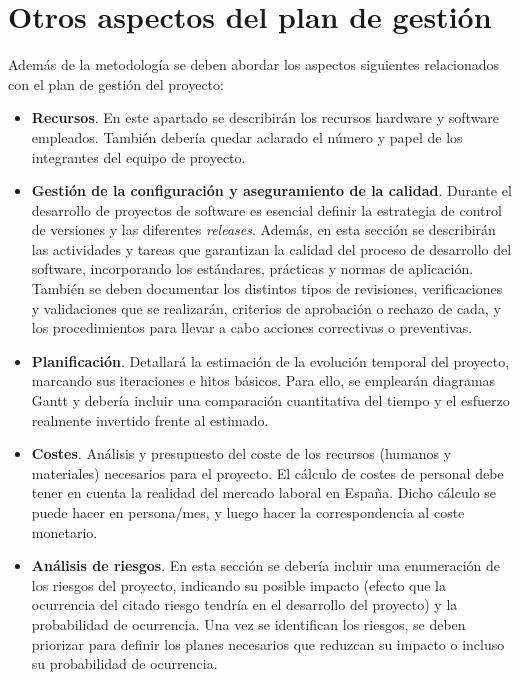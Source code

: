 \section{Otros aspectos del plan de gestión}
Además de la metodología se deben abordar los aspectos siguientes relacionados con el plan de gestión del proyecto:
\begin{itemize}
\item \textbf{Recursos}. En este apartado se describirán los recursos hardware y software empleados. También debería quedar aclarado el número y papel de los integrantes del equipo de proyecto.

\item \textbf{Gestión de la configuración y aseguramiento de la calidad}. Durante el desarrollo de proyectos de software es esencial definir la estrategia de control de versiones y las diferentes \emph{releases}. Además, en esta sección se describirán las actividades y tareas que garantizan la calidad del proceso de desarrollo del software, incorporando los estándares, prácticas y normas de aplicación. También se deben documentar los distintos tipos de revisiones, verificaciones y validaciones que se realizarán, criterios de aprobación o rechazo de cada, y los procedimientos para llevar a cabo acciones correctivas o preventivas.

\item \textbf{Planificación}. Detallará la estimación de la evolución temporal del proyecto, marcando sus iteraciones e hitos básicos. Para ello, se emplearán diagramas Gantt y debería incluir una comparación cuantitativa del tiempo y el esfuerzo realmente invertido frente al estimado.

\item \textbf{Costes}. Análisis y presupuesto del coste de los recursos (humanos y materiales) necesarios para el proyecto. El cálculo de costes de personal debe tener en cuenta la realidad del mercado laboral en España. Dicho cálculo se puede hacer en persona/mes, y luego hacer la correspondencia al coste monetario. 

\item \textbf{Análisis de riesgos}. En esta sección se debería incluir una enumeración de los riesgos del proyecto, indicando su posible impacto (efecto que la ocurrencia del citado riesgo tendría en el desarrollo del proyecto) y la probabilidad de ocurrencia. Una vez se identifican los riesgos, se deben priorizar para definir los planes necesarios que reduzcan su impacto o incluso su probabilidad de ocurrencia.
\end{itemize}


